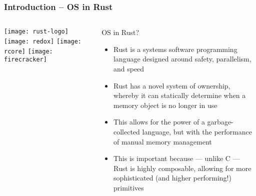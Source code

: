 \begin{frame}[plain]
	\frametitle{Introduction -- OS in Rust}
	
	
	
	\begin{columns}
		
		\begin{column}{.2\textwidth}
			
			\texttt{[image: rust-logo]}
			\texttt{[image: redox]}
			\texttt{[image: rcore]}
			\texttt{[image: firecracker]}
		\end{column}
		
		\begin{column}{.8\textwidth}
			
			OS in Rust?
			
			\begin{itemize}
				
				\item  Rust is a systems software programming language designed
				around safety, parallelism, and speed
				
				\item Rust has a novel system of ownership, whereby it can statically
				determine when a memory object is no longer in use
				
				\item This allows for the power of a garbage-collected language, but
				with the performance of manual memory management
				
				\item  This is important because — unlike C — Rust is highly
				composable, allowing for more sophisticated (and higher
				performing!) primitives
				
				
			\end{itemize}
			
		\end{column}
		
		
	\end{columns}
	
	
\end{frame}

